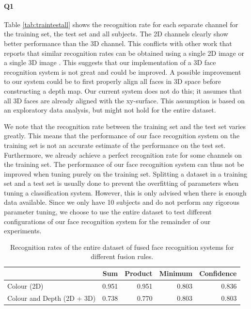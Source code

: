 \documentclass[]{article}
\begin{document}
\paragraph{Q1} Table \ref{tab:traintestall} shows the recognition rate for each separate channel for the training set, the test set and all subjects. The 2D channels clearly show better performance than the 3D channel. This conflicts with other work that reports that similar recognition rates can be obtained using a single 2D image or a single 3D image \cite{tsalakanidou2003use,chang2005evaluation}. This suggests that our implementation of a 3D face recognition system is not great and could be improved. A possible improvement to our system could be to first properly align all faces in 3D space before constructing a depth map. Our current system does not do this; it assumes that all 3D faces are already aligned with the xy-surface. This assumption is based on an exploratory data analysis, but might not hold for the entire dataset.

We note that the recognition rate between the training set and the test set varies greatly. This means that the performance of our face recognition system on the training set is not an accurate estimate of the performance on the test set. Furthermore, we already achieve a perfect recognition rate for some channels on the training set. The performance of our face recognition system can thus not be improved when tuning purely on the training set. Splitting a dataset in a training set and a test set is usually done to prevent the overfitting of parameters when tuning a classification system. However, this is only advised when there is enough data available. Since we only have 10 subjects and do not perform any rigorous parameter tuning, we choose to use the entire dataset to test different configurations of our face recognition system for the remainder of our experiments.

\begin{table}
	\centering
	\begin{tabular}{lrrrr}
		\toprule
		& Sum & Product & Minimum & Confidence\\
		\midrule
		Colour (2D) & 0.951 & 0.951 & 0.803 & 0.836\\
		Colour and Depth (2D + 3D) & 0.738 & 0.770 & 0.803 & 0.803 \\
		\bottomrule
	\end{tabular}
	\caption{Recognition rates of the entire dataset of fused face recognition systems for different fusion rules.}
	\label{tab:fusion-rules}
\end{table}
\end{document}
